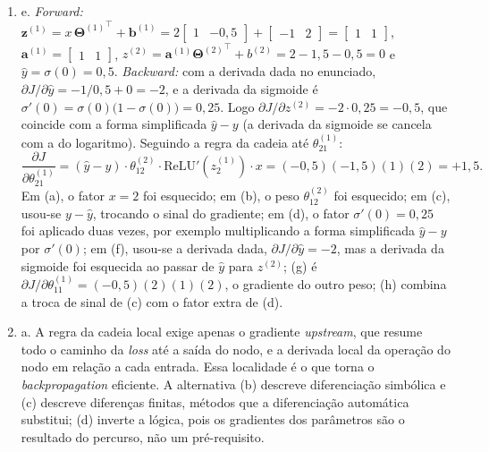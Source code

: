 \documentclass{dlproblemset}
\begin{document}
\begin{enumerate}[1)]
    \item e. \textit{Forward:} $\mathbf{z}^{(1)} = x\,{\mathbf{\Theta}^{(1)}}^{\top} + \mathbf{b}^{(1)} = 2\begin{bmatrix} 1 & -0{,}5 \end{bmatrix} + \begin{bmatrix} -1 & 2 \end{bmatrix} = \begin{bmatrix} 1 & 1 \end{bmatrix}$, $\mathbf{a}^{(1)} = \begin{bmatrix} 1 & 1 \end{bmatrix}$, $z^{(2)} = \mathbf{a}^{(1)}{\mathbf{\Theta}^{(2)}}^{\top} + b^{(2)} = 2 - 1{,}5 - 0{,}5 = 0$ e $\hat{y} = \sigma(0) = 0{,}5$. \textit{Backward:} com a derivada dada no enunciado, $\partial J/\partial \hat{y} = -1/0{,}5 + 0 = -2$, e a derivada da sigmoide é $\sigma'(0) = \sigma(0)\bigl(1 - \sigma(0)\bigr) = 0{,}25$. Logo $\partial J/\partial z^{(2)} = -2 \cdot 0{,}25 = -0{,}5$, que coincide com a forma simplificada $\hat{y} - y$ (a derivada da sigmoide se cancela com a do logaritmo). Seguindo a regra da cadeia até $\theta^{(1)}_{21}$:
    \[
    \frac{\partial J}{\partial \theta^{(1)}_{21}}
    = (\hat{y} - y)\cdot \theta^{(2)}_{12} \cdot \mathrm{ReLU}'(z^{(1)}_2) \cdot x
    = (-0{,}5)(-1{,}5)(1)(2) = +1{,}5 .
    \]
    Em (a), o fator $x = 2$ foi esquecido; em (b), o peso $\theta^{(2)}_{12}$ foi esquecido; em (c), usou-se $y - \hat{y}$, trocando o sinal do gradiente; em (d), o fator $\sigma'(0) = 0{,}25$ foi aplicado duas vezes, por exemplo multiplicando a forma simplificada $\hat{y} - y$ por $\sigma'(0)$; em (f), usou-se a derivada dada, $\partial J/\partial \hat{y} = -2$, mas a derivada da sigmoide foi esquecida ao passar de $\hat{y}$ para $z^{(2)}$; (g) é $\partial J/\partial \theta^{(1)}_{11} = (-0{,}5)(2)(1)(2)$, o gradiente do outro peso; (h) combina a troca de sinal de (c) com o fator extra de (d).

    \item a. A regra da cadeia local exige apenas o gradiente \textit{upstream}, que resume todo o caminho da \textit{loss} até a saída do nodo, e a derivada local da operação do nodo em relação a cada entrada. Essa localidade é o que torna o \textit{backpropagation} eficiente. A alternativa (b) descreve diferenciação simbólica e (c) descreve diferenças finitas, métodos que a diferenciação automática substitui; (d) inverte a lógica, pois os gradientes dos parâmetros são o resultado do percurso, não um pré-requisito.


\end{enumerate}
\end{document}
